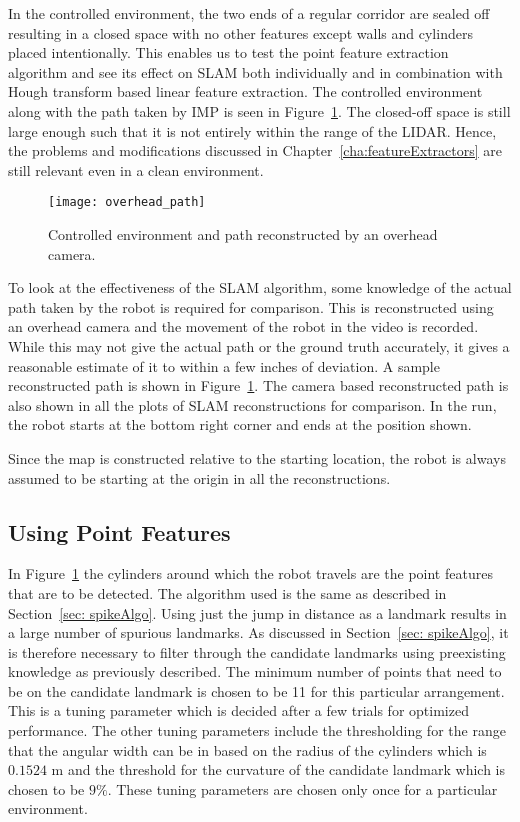 In the controlled environment, the two ends of a regular corridor are sealed off resulting in a closed space with no other features except walls and cylinders placed intentionally. This enables us to test the point feature extraction algorithm and see its effect on SLAM both individually and in combination with Hough transform based linear feature extraction. The controlled environment along with the path taken by IMP is seen in Figure~\ref{fig:overhead_path}. The closed-off space is still large enough such that it is not entirely within the range of the LIDAR. Hence, the problems and modifications discussed in Chapter~\ref{cha:featureExtractors} are still relevant even in a clean environment. 
\begin{figure}
\centering
\texttt{[image: overhead\_path]}
\caption{Controlled environment and path reconstructed by an overhead camera.}
\label{fig:overhead_path}
\end{figure}
To look at the effectiveness of the SLAM algorithm, some knowledge of the actual path taken by the robot is required for comparison. This is reconstructed using an overhead camera and the movement of the robot in the video is recorded. While this may not give the actual path or the ground truth accurately, it gives a reasonable estimate of it to within a few inches of deviation. A sample reconstructed path is shown in Figure~\ref{fig:overhead_path}. The camera based reconstructed path is also shown in all the plots of SLAM reconstructions for comparison. In the run, the robot starts at the bottom right corner and ends at the position shown.

Since the map is constructed relative to the starting location, the robot is always assumed to be starting at the origin in all the reconstructions.

\subsection{Using Point Features}
\label{sec: point_result}
In Figure~\ref{fig:overhead_path} the cylinders around which the robot travels are the point features that are to be detected. The algorithm used is the same as described in Section~\ref{sec: spikeAlgo}. Using just the jump in distance as a landmark results in a large number of spurious landmarks. As discussed in Section~\ref{sec: spikeAlgo}, it is therefore necessary to filter through the candidate landmarks using preexisting knowledge as previously described. The minimum number of points that need to be on the candidate landmark is chosen to be 11 for this particular arrangement. This is a tuning parameter which is decided after a few trials for optimized performance. The other tuning parameters include the thresholding for the range that the angular width can be in based on the radius of the cylinders which is $ 0.1524 $ m and the threshold for the curvature of the candidate landmark which is chosen to be $ 9 \% $. These tuning parameters are chosen only once for a particular environment. 

